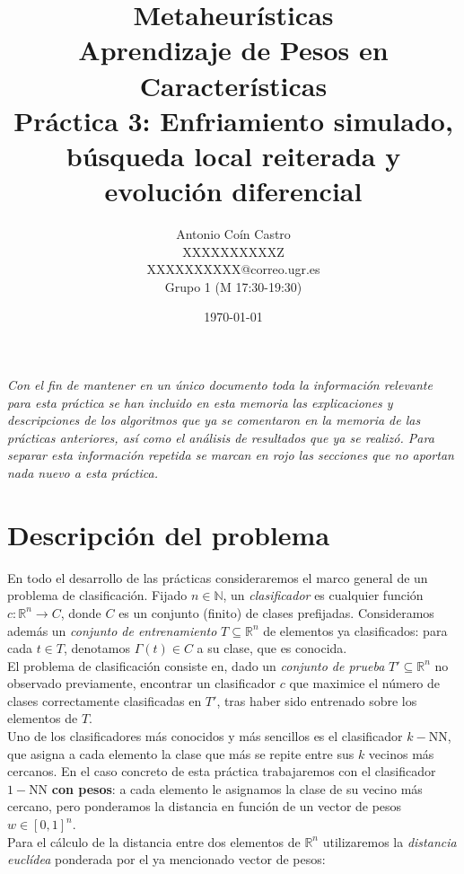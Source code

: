 \documentclass[12pt]{article}
\title{Metaheurísticas\\ \Large Aprendizaje de Pesos en Características \\ \large Práctica 3: Enfriamiento simulado, búsqueda local reiterada y evolución diferencial}
\author{Antonio Coín Castro \\ XXXXXXXXXXZ \\ XXXXXXXXXX@correo.ugr.es \\ Grupo 1 (M 17:30-19:30)}
\date{\today}
\begin{document}
\maketitle
\tableofcontents

\newpage

\textit{Con el fin de mantener en un único documento toda la información relevante para esta práctica se han incluido en esta memoria las explicaciones y descripciones de los algoritmos que ya se comentaron en la memoria de las prácticas anteriores, así como el análisis de resultados que ya se realizó. Para separar esta información repetida se marcan en {\color{red}rojo} las secciones que no aportan nada nuevo a esta práctica.}
\restoregeometry

\newpage

\section{Descripción del problema}

En todo el desarrollo de las prácticas consideraremos el marco general de un problema de clasificación. Fijado $n \in \mathbb{N}$, un \textit{clasificador} es cualquier función $c: \mathbb{R}^n \to C$, donde $C$ es un conjunto (finito) de clases prefijadas. Consideramos además un \textit{conjunto de entrenamiento} $T \subseteq \mathbb{R}^n$ de elementos ya clasificados: para cada $t \in T$, denotamos $\Gamma(t) \in C$ a su clase, que es conocida.\\

El problema de clasificación consiste en, dado un \textit{conjunto de prueba} $T'\subseteq \mathbb{R}^n$ no observado previamente, encontrar un clasificador $c$ que maximice el número de clases correctamente clasificadas en $T'$, tras haber sido entrenado sobre los elementos de $T$.\\

Uno de los clasificadores más conocidos y más sencillos es el clasificador $k-$NN, que asigna a cada elemento la clase que más se repite entre sus $k$ vecinos más cercanos. En el caso concreto de esta práctica trabajaremos con el clasificador $1-$NN \textbf{con pesos}: a cada elemento le asignamos la clase de su vecino más cercano, pero ponderamos la distancia en función de un vector de pesos $w \in [0,1]^n$.\\

Para el cálculo de la distancia entre dos elementos de $\mathbb{R}^n$ utilizaremos la \textit{distancia euclídea} ponderada por el ya mencionado vector de pesos:
\end{document}
